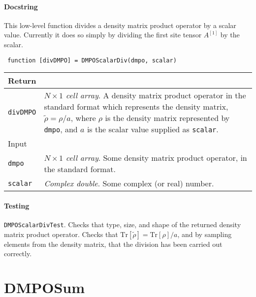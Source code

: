  \paragraph{Docstring} This low-level function divides a density matrix product operator by a scalar value. Currently it does so simply by dividing the first site tensor \(A^{[1]}\) by the scalar.
 \begin{lstlisting}
 function [divDMPO] = DMPOScalarDiv(dmpo, scalar) \end{lstlisting}
 \begin{longtabu}{X[1,l]X[4,l]}
 \hline
 Return & \\ \hline
 \lstinline$divDMPO$ & \emph{\(N \times 1\) cell array}. A density matrix product operator in the standard format which represents the density matrix, \(\tilde{\rho} = \rho / a\), where \(\rho\) is the density matrix represented by \lstinline$dmpo$, and \(a\) is the scalar value supplied as \lstinline$scalar$. \\ \hline
 Input & \\ \hline
 \lstinline$dmpo$ & \emph{\(N \times 1\) cell array}. Some density matrix product operator, in the standard format. \\
 \lstinline$scalar$ & \emph{Complex double}. Some complex (or real) number. \\
 \hline
 \end{longtabu}
 \paragraph{Testing} \lstinline$DMPOScalarDivTest$. Checks that type, size, and shape of the returned density matrix product operator. Checks that \(\mathrm{Tr}[\tilde{\rho}] = \mathrm{Tr}[\rho] / a\), and by sampling elements from the density matrix, that the division has been carried out correctly.

 \section{DMPOSum}
